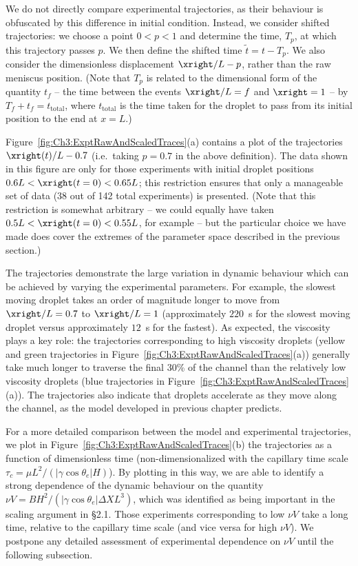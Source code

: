 We do not directly compare experimental trajectories, as their behaviour is obfuscated by this difference in initial condition. Instead, we consider shifted trajectories:  we choose a point $0 < p < 1$ and determine the time, $T_p$, at which this trajectory passes $p$. We then define the shifted time $\tilde{t} = t - T_p$. We also consider the dimensionless displacement $\xright/L - p$, rather than the raw meniscus position. (Note that $T_p$ is related to the dimensional form of the quantity $t_f$ -- the time between the events $\xright/L = f$ and $\xright = 1$ --  by $T_f + t_f = t_{\text{total}}$, where $t_{\text{total}}$ is the time taken for the droplet to pass from its initial position to the end at $x = L$.)

Figure~\ref{fig:Ch3:ExptRawAndScaledTraces}(a) contains a plot of the trajectories $\xright(t)/L -  0.7$ (i.e.~taking $p = 0.7$ in the above definition). The data shown in this figure are only for those experiments with initial droplet positions $0.6L < \xright(t = 0) <0.65L$; this restriction ensures that only a manageable set of data (38 out of 142 total experiments) is presented. (Note that this restriction is somewhat arbitrary -- we could equally have taken $0.5L < \xright(t = 0) <0.55L$, for example -- but the particular choice we have made does cover the extremes of the parameter space described in the previous section.)

The trajectories demonstrate the large variation in dynamic behaviour which can be achieved by varying the experimental parameters. For example, the slowest moving droplet takes an order of magnitude longer to move from $\xright/L = 0.7$ to $\xright/L = 1$ (approximately $220$~s for the slowest moving droplet versus approximately $12$~s for the fastest). As expected, the viscosity plays a key role: the trajectories corresponding to high viscosity droplets (yellow and green trajectories in Figure~\ref{fig:Ch3:ExptRawAndScaledTraces}(a)) generally take much longer to traverse the final 30\% of the channel than the relatively low viscosity droplets (blue trajectories in Figure~\ref{fig:Ch3:ExptRawAndScaledTraces}(a)). The trajectories also indicate that droplets accelerate as they move along the channel, as the model developed in previous chapter predicts.

For a more detailed comparison between the model and experimental trajectories, we plot in Figure~\ref{fig:Ch3:ExptRawAndScaledTraces}(b) the trajectories as a function of dimensionless time (non-dimensionalized with the capillary time scale $\tau_c = \mu L^2 / (|\gamma \cos \theta_e| H)$). By plotting in this way, we are able to identify a strong dependence of the dynamic behaviour on the quantity $\nu V = BH^2 / (|\gamma \cos \theta_e|\Delta X L^3)$, which was identified as being important in the scaling argument in \S2.1. Those experiments corresponding to low $\nu V$ take a long time, relative to the capillary time scale (and vice versa for high $\nu V$). We postpone any detailed assessment of experimental dependence on $\nu V$ until the following subsection. 

